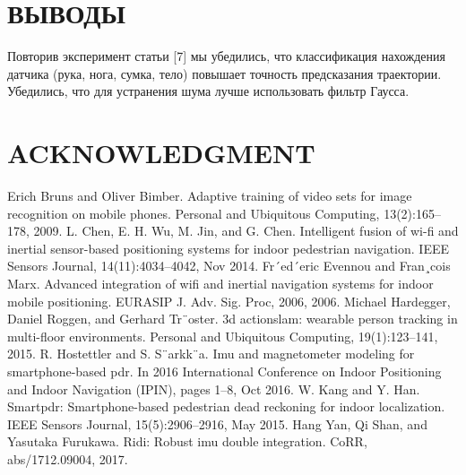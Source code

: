 \documentclass[letterpaper, 10 pt, conference]{ieeeconf}  %
\begin{document}
\section{ВЫВОДЫ}

 Повторив эксперимент статьи [7] мы убедились, что классификация нахождения датчика (рука, нога, сумка, тело) повышает точность предсказания траектории. Убедились, что для устранения шума лучше использовать фильтр Гаусса. 

\addtolength{\textheight}{-12cm}   %








\section*{ACKNOWLEDGMENT}




\begin{thebibliography}{99}

 Erich Bruns and Oliver Bimber. Adaptive training of video sets for image recognition on mobile
phones. Personal and Ubiquitous Computing, 13(2):165–178, 2009.
L. Chen, E. H. Wu, M. Jin, and G. Chen. Intelligent fusion of wi-fi and inertial sensor-based
positioning systems for indoor pedestrian navigation. IEEE Sensors Journal, 14(11):4034–4042,
Nov 2014.
 Fr´ed´eric Evennou and Fran¸cois Marx. Advanced integration of wifi and inertial navigation systems
for indoor mobile positioning. EURASIP J. Adv. Sig. Proc, 2006, 2006.
 Michael Hardegger, Daniel Roggen, and Gerhard Tr¨oster. 3d actionslam: wearable person tracking
in multi-floor environments. Personal and Ubiquitous Computing, 19(1):123–141, 2015.
 R. Hostettler and S. S¨arkk¨a. Imu and magnetometer modeling for smartphone-based pdr. In 2016
International Conference on Indoor Positioning and Indoor Navigation (IPIN), pages 1–8, Oct
2016.
 W. Kang and Y. Han. Smartpdr: Smartphone-based pedestrian dead reckoning for indoor
localization. IEEE Sensors Journal, 15(5):2906–2916, May 2015.
 Hang Yan, Qi Shan, and Yasutaka Furukawa. Ridi: Robust imu double integration. CoRR,
abs/1712.09004, 2017.

\end{thebibliography}
\end{document}
